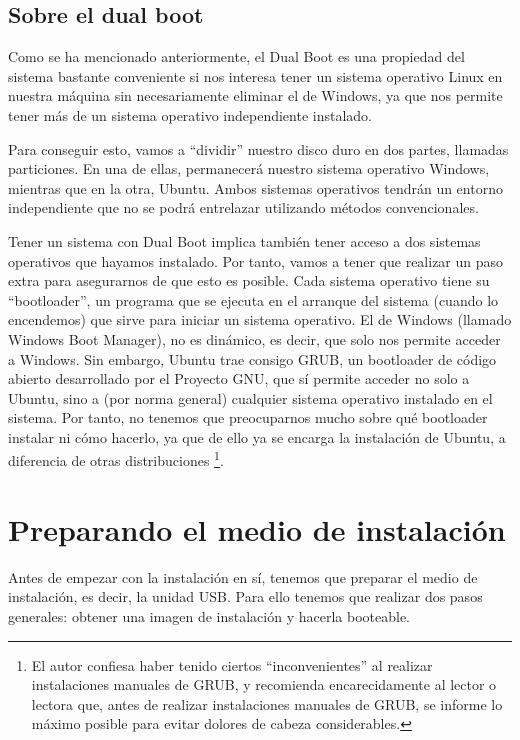 \documentclass[a4paper,12pt,oneside]{book}
\begin{document}
\section{Sobre el dual boot}
Como se ha mencionado anteriormente, el Dual Boot es una propiedad del sistema bastante conveniente si nos interesa tener un sistema operativo Linux en nuestra máquina sin necesariamente eliminar el de Windows, ya que nos permite tener más de un sistema operativo independiente instalado.

Para conseguir esto, vamos a “dividir” nuestro disco duro en dos partes, llamadas particiones. En una de ellas, permanecerá nuestro sistema operativo Windows, mientras que en la otra, Ubuntu. Ambos sistemas operativos tendrán un entorno independiente que no se podrá entrelazar utilizando métodos convencionales.

Tener un sistema con Dual Boot implica también tener acceso a dos sistemas operativos que hayamos instalado. Por tanto, vamos a tener que realizar un paso extra para asegurarnos de que esto es posible. Cada sistema operativo tiene su “bootloader”, un programa que se ejecuta en el arranque del sistema (cuando lo encendemos) que sirve para iniciar un sistema operativo. El de Windows (llamado Windows Boot Manager), no es dinámico, es decir, que solo nos permite acceder a Windows. Sin embargo, Ubuntu trae consigo GRUB, un bootloader de código abierto desarrollado por el Proyecto GNU, que sí permite acceder no solo a Ubuntu, sino a (por norma general) cualquier sistema operativo instalado en el sistema. Por tanto, no tenemos que preocuparnos mucho sobre qué bootloader instalar ni cómo hacerlo, ya que de ello ya se encarga la instalación de Ubuntu, a diferencia de otras distribuciones \footnote{El autor confiesa haber tenido ciertos “inconvenientes” al realizar instalaciones manuales de GRUB, y recomienda encarecidamente al lector o lectora que, antes de realizar instalaciones manuales de GRUB, se informe lo máximo posible para evitar dolores de cabeza considerables.}.

\chapter{Preparando el medio de instalación}

Antes de empezar con la instalación en sí, tenemos que preparar el medio de instalación, es decir, la unidad USB. Para ello tenemos que realizar dos pasos generales: obtener una imagen de instalación y hacerla booteable.
\end{document}
